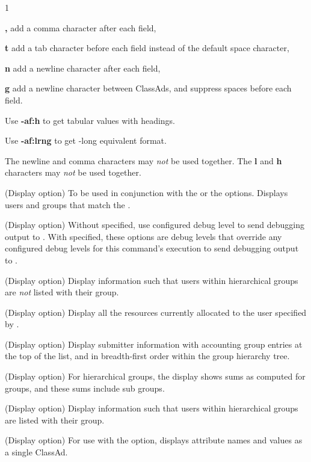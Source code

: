 \begin{ManPage}{\label{man-condor-userprio}}{1}
\begin{Options}
{    \textbf{,} add a comma character after each field,

    \textbf{t} add a tab character before each field instead of 
    the default space character,

    \textbf{n} add a newline character after each field,

    \textbf{g} add a newline character between ClassAds, and
    suppress spaces before each field.

    Use \textbf{-af:h} to get tabular values with headings.

    Use \textbf{-af:lrng} to get -long equivalent format.

    The newline and comma characters may \emph{not} be used together.
    The \textbf{l} and \textbf{h} characters may \emph{not} be used
    together.
    }

  {(Display option) To be used in conjunction with the  
   or the  options.
  Displays users and groups that match the . }

  {(Display option) Without  specified, 
  use configured debug level to send debugging output to .
  With  specified, these options are debug levels that
  override any configured debug levels for this command's execution
  to send debugging output to .}

  {(Display option) Display information such that users within hierarchical
  groups are \emph{not} listed with their group. }

  {(Display option) Display all the resources currently allocated to the 
  user specified by .  }

  {(Display option) Display submitter information with accounting group
   entries at the top of the list, 
   and in breadth-first order within the group hierarchy tree.}

  {(Display option) For hierarchical groups,
  the display shows sums as computed for groups, 
  and these sums include sub groups.  }

  {(Display option) Display information such that users within hierarchical
  groups are listed with their group. }

  {(Display option) For use with the  option,
  displays attribute names and values as a single ClassAd. }


\end{Options}
\end{ManPage}
